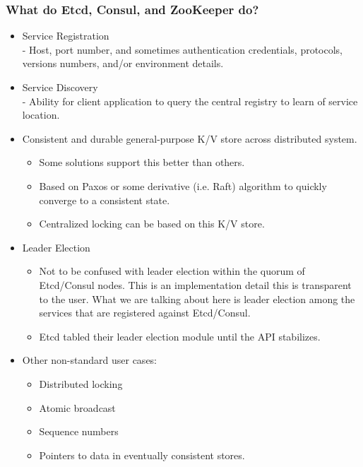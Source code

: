 \begin{frame}
    \frametitle{What do Etcd, Consul, and ZooKeeper do?}

\begin{itemize}
    \item Service Registration \\
        - Host, port number, and sometimes authentication credentials, protocols, versions numbers, and/or environment details.
    \item Service Discovery \\
        - Ability for client application to query the central registry to learn of service location.
    \item Consistent and durable general-purpose K/V store across distributed system.
        \begin{itemize}
            \item Some solutions support this better than others.
            \item Based on Paxos or some derivative (i.e. Raft) algorithm to quickly converge to a consistent state.
            \item Centralized locking can be based on this K/V store.
        \end{itemize}
    \item Leader Election
        \begin{itemize}
            \item Not to be confused with leader election within the quorum of Etcd/Consul nodes. This is an implementation detail this is transparent to the user. What we are talking about here is leader election among the services that are registered against Etcd/Consul.
            \item Etcd tabled their leader election module until the API stabilizes.
        \end{itemize}
    \item Other non-standard user cases:
        \begin{itemize}
            \item Distributed locking
            \item Atomic broadcast
            \item Sequence numbers
            \item Pointers to data in eventually consistent stores.
        \end{itemize}
\end{itemize}

\end{frame}

